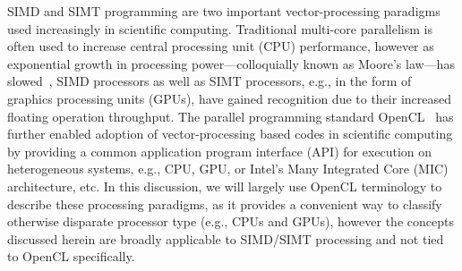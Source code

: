 \documentclass[12pt,number,sort&compress,preprint]{elsarticle}
\begin{document}
SIMD and SIMT programming are two important vector-processing paradigms used increasingly in scientific computing.
Traditional multi-core parallelism is often used to increase central processing unit (CPU) performance, however as exponential growth in processing power---colloquially known as Moore's law---has slowed~\cite{khan2018science}, SIMD processors as well as SIMT processors, e.g., in the form of graphics processing units (GPUs), have gained recognition due to their increased floating operation throughput.
The parallel programming standard OpenCL~\cite{stone2010opencl} has further enabled adoption of vector-processing based codes in scientific computing by providing a common application program interface (API) for execution on heterogeneous systems, e.g., CPU, GPU, or Intel's Many Integrated Core (MIC) architecture, etc.
In this discussion, we will largely use OpenCL terminology to describe these processing paradigms, as it provides a convenient way to classify otherwise disparate processor type (e.g., CPUs and GPUs), however the concepts discussed herein are broadly applicable to SIMD\slash SIMT processing and not tied to OpenCL specifically.
\end{document}

